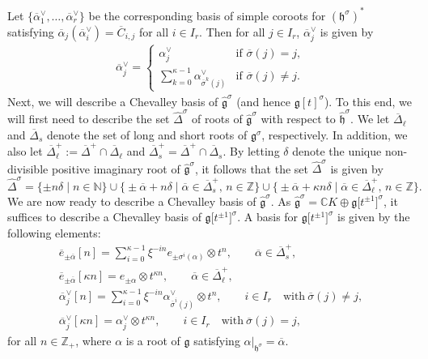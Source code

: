 \documentclass[10pt,a4paper]{amsart}
\numberwithin{equation}{section}
\begin{document}
Let $\{\overline{\alpha}_1^{\vee},\dots, \overline{\alpha}_r^{\vee}\}$ be the corresponding basis of simple coroots for $(\mathfrak{h}^{\sigma})^*$ satisfying $\overline{\alpha}_j(\overline{\alpha}_i^{\vee})=\overline{C}_{i,j}$ for all $i\in I_r$. Then for all $j\in I_r$, $\overline{\alpha}_j^{\vee}$ is given by
\begin{gather*}
\overline{\alpha}_j^{\vee}=
\begin{cases}
\alpha_j^{\vee} & \text{if }\overline{\sigma}(j)=j,\\
\displaystyle \sum_{k=0}^{\kappa-1}\alpha_{\overline{\sigma}^k(j)}^{\vee} & \text{if }\overline{\sigma}(j)\neq j.
\end{cases}
\end{gather*}
Next, we will describe a Chevalley basis of $\widehat{\mathfrak{g}}^{\sigma}$ (and hence $\mathfrak{g}[t]^{\sigma}$). To this end, we will first need to describe the set $\widehat{\Delta}^{\sigma}$ of roots of $\widehat{\mathfrak{g}}^{\sigma}$ with respect to $\widehat{\mathfrak{h}}^{\sigma}$. We let $\overline{\Delta}_{\ell}$ and $\overline{\Delta}_s$ denote the set of long and short roots of $\mathfrak{g}^{\sigma}$, respectively. In addition, we also let $\overline{\Delta}_{\ell}^+:= \overline{\Delta}^+ \cap \overline{\Delta}_{\ell}$ and $\overline{\Delta}_s^+= \overline{\Delta}^+\cap\overline{\Delta}_s$. By letting $\delta$ denote the unique non-divisible positive imaginary root of $\widehat{\mathfrak{g}}^{\sigma}$, it follows that the set $\widehat{\Delta}^{\sigma}$ is given by
\[
\widehat{\Delta}^{\sigma}=\{\pm n\delta\mid n\in\mathbb{N}\}\cup\bigl\{\pm\overline{\alpha}+ n\delta\mid \overline{\alpha}\in\overline{\Delta}_s^+,\,n\in\mathbb{Z}\bigr\}\cup\bigl\{\pm\overline{\alpha}+\kappa n\delta\mid \overline{\alpha}\in\overline{\Delta}_{\ell}^+,\,n\in\mathbb{Z}\bigr\}.
\]
We are now ready to describe a Chevalley basis of $\widehat{\mathfrak{g}}^{\sigma}$. As $\widehat{\mathfrak{g}}^{\sigma}=\mathbb{C}K\oplus\mathfrak{g}\bigl[t^{\pm1}\bigr]^{\sigma}$, it suffices to describe a Chevalley basis of $\mathfrak{g}\bigl[t^{\pm1}\bigr]^{\sigma}$. A basis for $\mathfrak{g}\bigl[t^{\pm1}\bigr]^{\sigma}$ is given by the following elements:
\begin{gather*}
\overline{e}_{\pm\overline{\alpha}}[n]=\sum_{i=0}^{\kappa-1}\xi^{-in}e_{\pm\sigma^i(\alpha)}\otimes t^n,\qquad\overline{\alpha}\in\overline{\Delta}_s^+,\\
\overline{e}_{\pm\overline{\alpha}}[\kappa n]=e_{\pm\alpha}\otimes t^{\kappa n},\qquad\overline{\alpha}\in \overline{\Delta}_{\ell}^+,\\
\overline{\alpha}_j^{\vee}[n]=\sum_{i=0}^{\kappa-1}\xi^{-in}\alpha_{\overline{\sigma}^i(j)}^{\vee}\otimes t^n,\qquad i\in I_r\quad\text{with}\ \overline{\sigma}(j)\neq j,\\
\overline{\alpha}_j^{\vee}[\kappa n]=\alpha_j^{\vee}\otimes t^{\kappa n},\qquad i\in I_r\quad\text{with}\ \overline{\sigma}(j)= j,
\end{gather*}
for all $n\in\mathbb{Z}_+$, where $\alpha$ is a root of $\mathfrak{g}$ satisfying $\alpha|_{\mathfrak{h}^{\sigma}} =\overline{\alpha}$.
\end{document}
